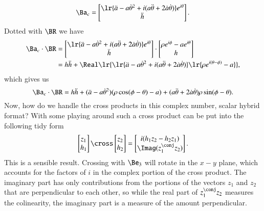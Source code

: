 {%
\begin{equation}\label{eqn:relativisticElectrodynamicsExamReflection:940}
\Ba_c =
\begin{bmatrix}
\lr{
   \ddot{a} - a {\dot{\theta}}^2 + i ( a\ddot{\theta} + 2 \dot{a} \dot{\theta} ) 
}
e^{i\theta} \\
\ddot{h}
\end{bmatrix}.
\end{equation}
%
Dotted with \(\BR\) we have
%
\begin{equation}\label{eqn:relativisticElectrodynamicsExamReflection:1290}
\begin{aligned}
\Ba_c \cdot \BR
&=
\begin{bmatrix}
\lr{
   \ddot{a} - a {\dot{\theta}}^2 + i ( a\ddot{\theta} + 2 \dot{a} \dot{\theta} ) 
}
e^{i\theta} \\
\ddot{h}
\end{bmatrix}
\cdot
\begin{bmatrix}
\rho e^{i\phi} - a e^{i\theta} \\
h
\end{bmatrix} \\
&=
h \ddot{h} + \Real
\lr{
   \lr{
      \ddot{a} - a {\dot{\theta}}^2 + i ( a\ddot{\theta} + 2 \dot{a} \dot{\theta} ) 
   }
   \lr{
      \rho e^{i(\theta- \phi)} - a
   }
}
,
\end{aligned}
\end{equation}
%
which gives us
%
\begin{equation}\label{eqn:relativisticElectrodynamicsExamReflection:950}
\Ba_c \cdot \BR =
h \ddot{h} +
( \ddot{a} - a {\dot{\theta}}^2 ) (\rho \cos(\phi - \theta) - a)
+ (a \ddot{\theta} + 2 \dot{a} \dot{\theta}) \rho \sin(\phi - \theta).
\end{equation}
%
Now, how do we handle the cross products in this complex number, scalar hybrid format?  With some playing around such a cross product can be put into the following tidy form
%
\begin{equation}\label{eqn:relativisticElectrodynamicsExamReflection:960}
\begin{bmatrix}
z_1 \\
h_1
\end{bmatrix}
\cross
\begin{bmatrix}
z_2 \\
h_2
\end{bmatrix}
=
\begin{bmatrix}
i (h_1 z_2 - h_2 z_1) \\
\Imag(z_1^\conj z_2)
\end{bmatrix}.
\end{equation}
%
This is a sensible result.  Crossing with \(\Be_3\) will rotate in the \(x-y\) plane, which accounts for the factors of \(i\) in the complex portion of the cross product.  The imaginary part has only contributions from the portions of the vectors \(z_1\) and \(z_2\) that are perpendicular to each other, so while the real part of \(z_1^\conj z_2\) measures the colinearity, the imaginary part is a measure of the amount perpendicular.

}
